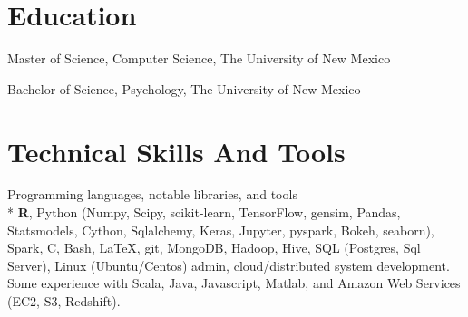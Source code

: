 \documentclass[print]{friggeri-cv} %
\begin{document}
\section{Education}
\begin{description}
  \item {\largeheaderfont Master of Science, Computer Science}, The University
    of New Mexico \hfill 
    {}
  \item  {\largeheaderfont Bachelor of Science, Psychology}, The University of
    New Mexico \hfill
    { }
\end{description}

\section{Technical Skills And Tools}
\begin{description}
   \item {\smallheaderfont Programming languages, notable libraries, and tools} \\*
        \textbf{R}, Python (Numpy, Scipy, scikit-learn, TensorFlow, gensim,
        Pandas, Statsmodels, Cython, Sqlalchemy, Keras, Jupyter, pyspark,
        Bokeh, seaborn), Spark, C, Bash,
        \LaTeX, git, MongoDB, Hadoop, Hive, SQL (Postgres,
        Sql Server), Linux (Ubuntu/Centos) admin, cloud/distributed system development.
        Some experience with Scala, Java, Javascript,
        Matlab, and Amazon Web Services (EC2, S3, Redshift).

\end{description}
\end{document}
